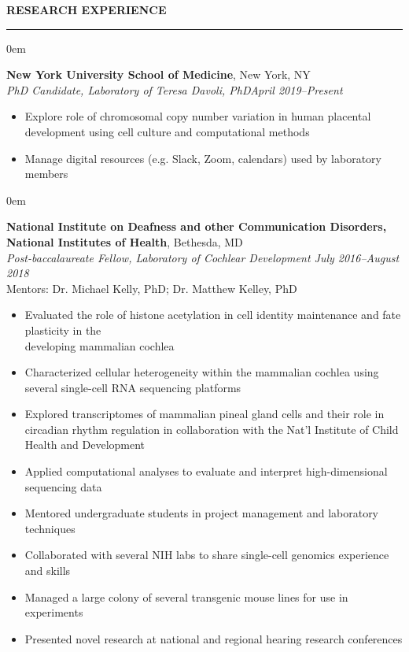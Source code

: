 \documentclass[11pt, letterpaper]{article}
\newenvironment{CVSection}{
\begin{addmargin}[2em]{0em}
\begin{samepage}}
{\end{samepage}
\end{addmargin}\bigskip}
\newcommand{\CVHeading}[1]{
\MakeUppercase{\bf #1}
\smallskip
\hrule
\medskip
}
\begin{document}
\CVHeading{Research Experience}
\begin{CVSection}
\textbf{New York University School of Medicine}, New York, NY\\
\textsl{PhD Candidate, Laboratory of Teresa Davoli, PhD\hfill April 2019--Present}
\begin{itemize}
    \item Explore role of chromosomal copy number variation in human placental development using cell culture and computational methods
    \item Manage digital resources (e.g. Slack, Zoom, calendars) used by laboratory members
\end{itemize}
\end{CVSection}
\begin{CVSection}
\textbf{National Institute on Deafness and other Communication Disorders,\\National Institutes of Health}, Bethesda, MD\\
\textsl{Post-baccalaureate Fellow, Laboratory of Cochlear Development	\hfill July 2016--August 2018\\}
Mentors: Dr. Michael Kelly, PhD; Dr. Matthew Kelley, PhD
\begin{itemize}
\item Evaluated the role of histone acetylation in cell identity maintenance and fate plasticity in the\\ developing mammalian cochlea
\item Characterized cellular heterogeneity within the mammalian cochlea using several single-cell RNA sequencing platforms
\item Explored transcriptomes of mammalian pineal gland cells and their role in circadian rhythm regulation in collaboration with the Nat'l Institute of Child Health and Development
\item Applied computational analyses to evaluate and interpret high-dimensional sequencing data
\item Mentored undergraduate students in project management and laboratory techniques
\item Collaborated with several NIH labs to share single-cell genomics experience and skills
\item Managed a large colony of several transgenic mouse lines for use in experiments
\item Presented novel research at national and regional hearing research conferences
\end{itemize}
\end{CVSection}
\end{document}
